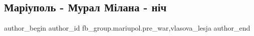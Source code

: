  
 
 
 
 

\subsection{Маріуполь - Мурал Мілана - ніч}
\label{sec:10_12_2022.fb.fb_group.mariupol.pre_war.1.mar_upol___mural_m_l}
 
\ifcmt
 author_begin
   author_id fb_group.mariupol.pre_war,vlasova_lesja
 author_end
\fi
